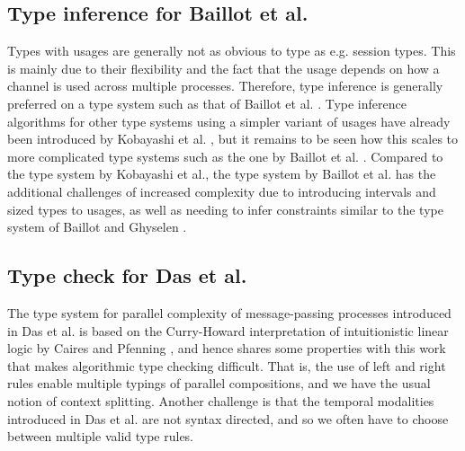 
\subsection*{Type inference for Baillot et al.}
Types with usages are generally not as obvious to type as e.g. session types. This is mainly due to their flexibility and the fact that the usage depends on how a channel is used across multiple processes. Therefore, type inference is generally preferred on a type system such as that of Baillot et al. \cite{BaillotEtAl2021}. Type inference algorithms for other type systems using a simpler variant of usages have already been introduced by Kobayashi et al. \cite{KobayashiEtAl2000}, but it remains to be seen how this scales to more complicated type systems such as the one by Baillot et al. \cite{BaillotEtAl2021}. Compared to the type system by Kobayashi et al., the type system by Baillot et al. has the additional challenges of increased complexity due to introducing intervals and sized types to usages, as well as needing to infer constraints similar to the type system of Baillot and Ghyselen \cite{BaillotGhyselen2021}.

\subsection*{Type check for Das et al.} %
The type system for parallel complexity of message-passing processes introduced in Das et al. \cite{DasEtAl2018} is based on the Curry-Howard interpretation of intuitionistic linear logic by Caires and Pfenning \cite{CairesPfenning2010}, and hence shares some properties with this work that makes algorithmic type checking difficult. That is, the use of left and right rules enable multiple typings of parallel compositions, and we have the usual notion of context splitting. Another challenge is that the temporal modalities introduced in Das et al. \cite{DasEtAl2018} are not syntax directed, and so we often have to choose between multiple valid type rules.

